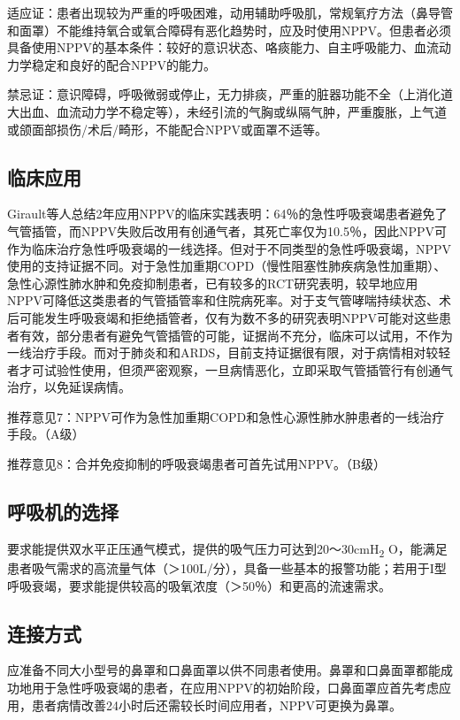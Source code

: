 适应证：患者出现较为严重的呼吸困难，动用辅助呼吸肌，常规氧疗方法（鼻导管和面罩）不能维持氧合或氧合障碍有恶化趋势时，应及时使用NPPV。但患者必须具备使用NPPV的基本条件：较好的意识状态、咯痰能力、自主呼吸能力、血流动力学稳定和良好的配合NPPV的能力。

禁忌证：意识障碍，呼吸微弱或停止，无力排痰，严重的脏器功能不全（上消化道大出血、血流动力学不稳定等），未经引流的气胸或纵隔气肿，严重腹胀，上气道或颌面部损伤/术后/畸形，不能配合NPPV或面罩不适等。

\subsection{临床应用}

Girault等人总结2年应用NPPV的临床实践表明：64％的急性呼吸衰竭患者避免了气管插管，而NPPV失败后改用有创通气者，其死亡率仅为10.5％，因此NPPV可作为临床治疗急性呼吸衰竭的一线选择。但对于不同类型的急性呼吸衰竭，NPPV使用的支持证据不同。对于急性加重期COPD（慢性阻塞性肺疾病急性加重期）、急性心源性肺水肿和免疫抑制患者，已有较多的RCT研究表明，较早地应用NPPV可降低这类患者的气管插管率和住院病死率。对于支气管哮喘持续状态、术后可能发生呼吸衰竭和拒绝插管者，仅有为数不多的研究表明NPPV可能对这些患者有效，部分患者有避免气管插管的可能，证据尚不充分，临床可以试用，不作为一线治疗手段。而对于肺炎和和ARDS，目前支持证据很有限，对于病情相对较轻者才可试验性使用，但须严密观察，一旦病情恶化，立即采取气管插管行有创通气治疗，以免延误病情。

推荐意见7：NPPV可作为急性加重期COPD和急性心源性肺水肿患者的一线治疗手段。（A级）

推荐意见8：合并免疫抑制的呼吸衰竭患者可首先试用NPPV。（B级）

\subsection{呼吸机的选择}

要求能提供双水平正压通气模式，提供的吸气压力可达到20～30cmH\textsubscript{2}
O，能满足患者吸气需求的高流量气体（＞100L/分），具备一些基本的报警功能；若用于I型呼吸衰竭，要求能提供较高的吸氧浓度（＞50％）和更高的流速需求。

\subsection{连接方式}

应准备不同大小型号的鼻罩和口鼻面罩以供不同患者使用。鼻罩和口鼻面罩都能成功地用于急性呼吸衰竭的患者，在应用NPPV的初始阶段，口鼻面罩应首先考虑应用，患者病情改善24小时后还需较长时间应用者，NPPV可更换为鼻罩。

